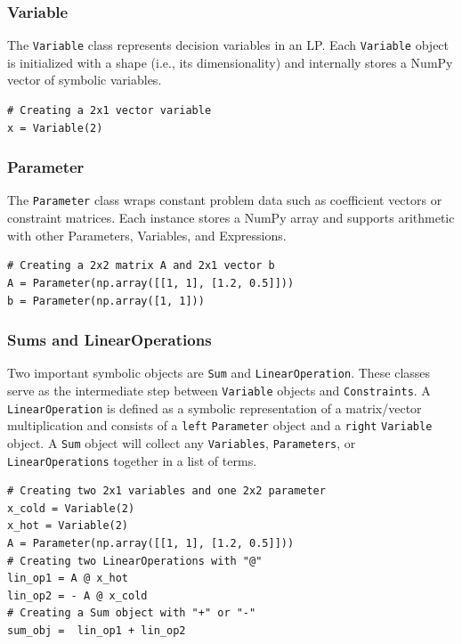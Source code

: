 \documentclass[conference]{IEEEtran}
\begin{document}
\subsubsection{Variable} 
The \texttt{Variable} class represents decision variables in an LP. 
Each \texttt{Variable} object is initialized with a shape (i.e., its dimensionality) and internally stores a NumPy vector of symbolic variables. 

\begin{lstlisting}[style=mypython] 
# Creating a 2x1 vector variable
x = Variable(2) 
\end{lstlisting}

\subsubsection{Parameter} 
The \texttt{Parameter} class wraps constant problem data such as coefficient vectors or constraint matrices. 
Each instance stores a NumPy array and supports arithmetic with other Parameters, Variables, and Expressions.

\begin{lstlisting}[style=mypython] 
# Creating a 2x2 matrix A and 2x1 vector b
A = Parameter(np.array([[1, 1], [1.2, 0.5]])) 
b = Parameter(np.array([1, 1])) 
\end{lstlisting}

\subsubsection{Sums and LinearOperations}
Two important symbolic objects are \texttt{Sum} and \texttt{LinearOperation}.
These classes serve as the intermediate step between \texttt{Variable} objects and \texttt{Constraints}.
A \texttt{LinearOperation} is defined as a symbolic representation of a matrix/vector multiplication and consists of a \texttt{left} \texttt{Parameter} object and a \texttt{right} \texttt{Variable} object.
A \texttt{Sum} object will collect any \texttt{Variables}, \texttt{Parameters}, or \texttt{LinearOperations} together in a list of terms.
\begin{lstlisting}[style=mypython]
# Creating two 2x1 variables and one 2x2 parameter 
x_cold = Variable(2)
x_hot = Variable(2)
A = Parameter(np.array([[1, 1], [1.2, 0.5]])) 
# Creating two LinearOperations with "@"
lin_op1 = A @ x_hot
lin_op2 = - A @ x_cold
# Creating a Sum object with "+" or "-"
sum_obj =  lin_op1 + lin_op2
\end{lstlisting}
\end{document}
